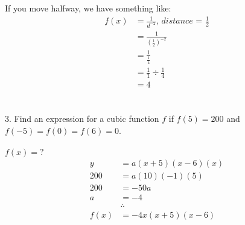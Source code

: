 \documentclass{article}
\begin{document}
If you move halfway, we have something like:
\begin{equation}
\begin{split}
    f(x) & = \frac{1}{d^{-2}} \textit{, distance = $\frac{1}{2}$}\\
    & = \frac{1}{(\frac{1}{2})^{-2}}\\
    & = \frac{1}{\frac{1}{4}}\\
    & = \frac{1}{1} \div \frac{1}{4}\\
    & = 4
\end{split}
\end{equation}
\\\\
3. Find an expression for a cubic function $f$ if $f(5) = 200$ and 
$f(−5) = f(0) = f(6) = 0$.
\\\\
$f(x) = ?$\\
\begin{equation}
\begin{split}
    y & = a (x+5)(x-6)(x)\\
    200 & = a (10)(-1)(5)\\
    200 & = -50a\\
    a & = -4\\
    & \therefore\\
    f(x) & = -4x(x+5)(x-6)
\end{split}
\end{equation}
\end{document}
